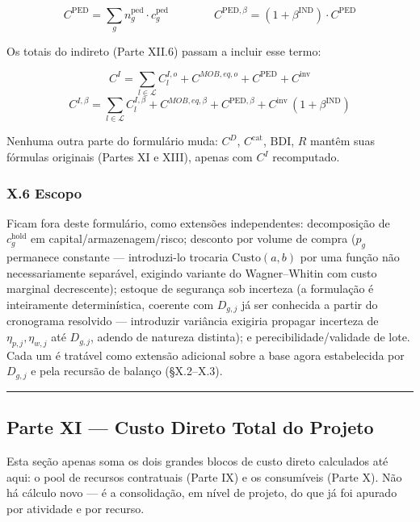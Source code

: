 \documentclass[
  10pt,
]{article}
\begin{document}
\[\boxed{C^{\mathrm{PED}} = \sum_g n_g^{\text{ped}}\cdot c_g^{\text{ped}}}\qquad\qquad C^{\mathrm{PED},\beta} = (1+\beta^{\mathrm{IND}})\cdot C^{\mathrm{PED}}\]

Os totais do indireto (Parte XII.6) passam a incluir esse termo:

\[C^I = \sum_{l\in\mathcal{L}} C_l^{I,o} + C^{MOB,eq,o} + C^{\mathrm{PED}} + C^{\mathrm{inv}}\]
\[C^{I,\beta} = \sum_{l\in\mathcal{L}} C_l^{I,\beta} + C^{MOB,eq,\beta} + C^{\mathrm{PED},\beta} + C^{\mathrm{inv}}\,(1+\beta^{\mathrm{IND}})\]

Nenhuma outra parte do formulário muda: \(C^D\), \(C^{\mathrm{cat}}\),
\(\mathrm{BDI}\), \(R\) mantêm suas fórmulas originais (Partes XI e
XIII), apenas com \(C^I\) recomputado.

\hypertarget{x.6-escopo}{%
\subsubsection{X.6 Escopo}\label{x.6-escopo}}

Ficam fora deste formulário, como extensões independentes: decomposição
de \(c_g^{\text{hold}}\) em capital/armazenagem/risco; desconto por
volume de compra (\(p_g\) permanece constante --- introduzi-lo trocaria
\(\mathrm{Custo}(a,b)\) por uma função não necessariamente separável,
exigindo variante do Wagner--Whitin com custo marginal decrescente);
estoque de segurança sob incerteza (a formulação é inteiramente
determinística, coerente com \(D_{g,j}\) já ser conhecida a partir do
cronograma resolvido --- introduzir variância exigiria propagar
incerteza de \(\eta_{p,j},\eta_{w,j}\) até \(D_{g,j}\), adendo de
natureza distinta); e perecibilidade/validade de lote. Cada um é
tratável como extensão adicional sobre a base agora estabelecida por
\(D_{g,j}\) e pela recursão de balanço (§X.2--X.3).

\begin{center}\rule{0.5\linewidth}{0.5pt}\end{center}

\hypertarget{parte-xi-custo-direto-total-do-projeto}{%
\subsection{Parte XI --- Custo Direto Total do
Projeto}\label{parte-xi-custo-direto-total-do-projeto}}

Esta seção apenas soma os dois grandes blocos de custo direto calculados
até aqui: o pool de recursos contratuais (Parte IX) e os consumíveis
(Parte X). Não há cálculo novo --- é a consolidação, em nível de
projeto, do que já foi apurado por atividade e por recurso.
\end{document}
